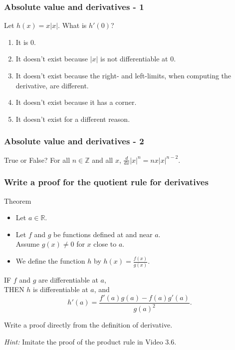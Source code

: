 \begin{frame}[t]
	\frametitle{Absolute value and derivatives - 1}

	Let $h(x) = x|x|$. What is $h'(0)$?

	\begin{enumerate}
		\item It is 0.

		\item It doesn't exist because $|x|$ is not differentiable at $0$.

		\item It doesn't exist because the right- and left-limits, when computing the
			derivative, are different.

		\item It doesn't exist because it has a corner.

		\item It doesn't exist for a different reason.
	\end{enumerate}
\end{frame}

\begin{frame}[t]
	\frametitle{Absolute value and derivatives - 2}

	\begin{block}{True or False?}
		For all $n \in \mathbb{Z}$ and all $x$, $\frac{d}{dx}|x|^{n}=nx|x|^{n-2}$.
	\end{block}
\end{frame}

\begin{frame}[t]
	\fontsize{13}{13}\selectfont
	\frametitle{Write a proof for the quotient rule for derivatives}

	\begin{block}{Theorem}
		\begin{itemize}
			\item Let $a \in \mathbb{R}$.

			\item Let $f$ and $g$ be functions defined at and near $a$. \\ Assume
				$g(x) \neq 0$ for $x$ close to $a$.

			\item We define the function $h$ by $\displaystyle h(x) = \frac{f(x)}{g(x)}$.
		\end{itemize}

		IF $f$ and $g$ are differentiable at $a$, \\ THEN $h$ is differentiable at $a$,
		and
		\[
			h'(a) = \frac{f'(a) g(a) - f(a) g'(a)}{g(a)^{2}}.
		\]
	\end{block}

	\vfill

	Write a proof directly from the definition of derivative.

	\emph{Hint:} Imitate the proof of the product rule in Video 3.6.
\end{frame}

